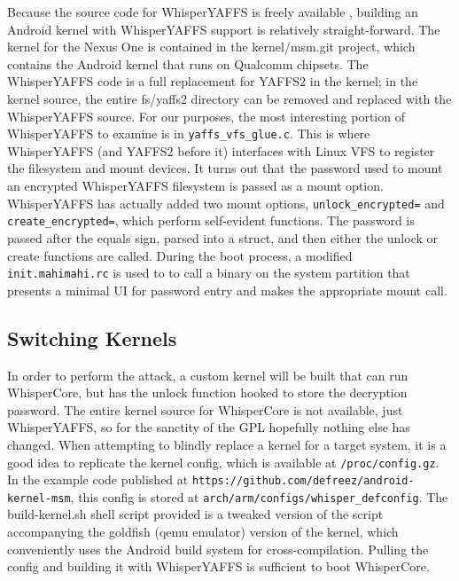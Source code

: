 Because the source code for WhisperYAFFS is freely available \cite{whisperyaffs}, building an Android kernel with WhisperYAFFS
support is relatively straight-forward. The kernel for the Nexus One is contained in the kernel/msm.git project, which contains the
Android kernel that runs on Qualcomm chipsets.  The WhisperYAFFS code is a full replacement for YAFFS2 in the kernel; in the kernel
source, the entire fs/yaffs2 directory can be removed and replaced with the WhisperYAFFS source.  For our purposes, the most
interesting portion of WhisperYAFFS to examine is in \texttt{yaffs\_vfs\_glue.c}.  This is where WhisperYAFFS (and YAFFS2 before it)
interfaces with Linux VFS to register the filesystem and mount devices.  It turns out that the password used to mount an encrypted
WhisperYAFFS filesystem is passed as a mount option.  WhisperYAFFS has actually added two mount options, \texttt{unlock\_encrypted=}
and \texttt{create\_encrypted=}, which perform self-evident functions.  The password is passed after the equals sign, parsed into a
struct, and then either the unlock or create functions are called.  During the boot process, a modified \texttt{init.mahimahi.rc} is
used to to call a binary on the system partition that presents a minimal UI for password entry and makes the appropriate mount call. 

\subsection{Switching Kernels}
In order to perform the attack, a custom kernel will be built that can run WhisperCore, but has the unlock function hooked to store the decryption password. 
The entire kernel source for WhisperCore is not available, just WhisperYAFFS, so for the sanctity of the GPL hopefully nothing else has changed. 
When attempting to blindly replace a kernel for a target system, it is a good idea to replicate the kernel config, which is available at \texttt{/proc/config.gz}. 
In the example code published at \texttt{https://github.com/defreez/android-kernel-msm}, this config is stored at \texttt{arch/arm/configs/whisper\_defconfig}. 
The build-kernel.sh shell script provided is a tweaked version of the script accompanying the goldfish (qemu emulator) version of the kernel, which conveniently uses the Android build system for cross-compilation. 
Pulling the config and building it with WhisperYAFFS is sufficient to boot WhisperCore.

